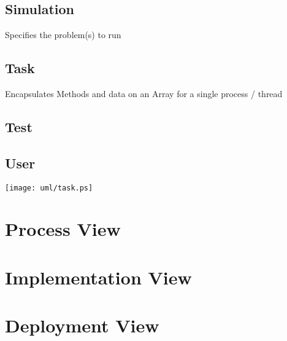 \documentclass{book}
\begin{document}
\section{Simulation}

Specifies the problem(s) to run

\section{Task}

Encapsulates Methods and data on an Array for a single process /
thread

\section{Test}

\section{User}

\centerline{\texttt{[image: uml/task.ps]}}

\chapter{Process View}

\chapter{Implementation View}

\chapter{Deployment View}
\end{document}
